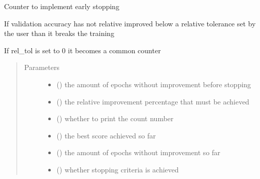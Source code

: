 \documentclass[letterpaper,10pt,english]{sphinxmanual}
\begin{document}

\begin{fulllineitems}
\label{\detokenize{index:Src.deeplearning.early_stopping}}
Counter to implement early stopping

If validation accuracy has not relative improved below
a relative tolerance set by the user than it breaks the
training

If rel\_tol is set to 0 it becomes a common counter
\begin{quote}\begin{description}
\item[{Parameters}] \leavevmode\begin{itemize}
\item {} 
 () \textendash{} the amount of epochs without improvement before stopping

\item {} 
 () \textendash{} the relative improvement percentage that must be achieved

\item {} 
 () \textendash{} whether to print the count number

\item {} 
 () \textendash{} the best score achieved so far

\item {} 
 () \textendash{} the amount of epochs without improvement so far

\item {} 
 () \textendash{} whether stopping criteria is achieved

\end{itemize}

\end{description}\end{quote}

\end{fulllineitems}
\end{document}
